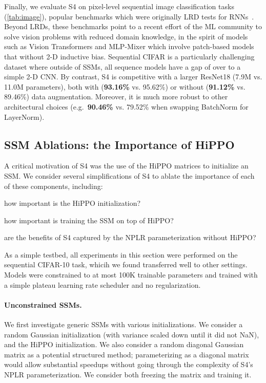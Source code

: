 \documentclass{article}
\newcommand{\methodabbrv}{S4}
\begin{document}
Finally,
we evaluate \methodabbrv{} on pixel-level sequential image classification tasks (\cref{tab:image}),
popular benchmarks which were originally LRD tests for RNNs~\citep{arjovsky2016unitary}.
Beyond LRDs, these benchmarks point to a recent effort of the ML community to solve vision
problems with reduced domain knowledge,
in the spirit of models such as Vision Transformers \citep{dosovitskiy2020image} and MLP-Mixer \citep{tolstikhin2021mlp} which involve patch-based models that without 2-D inductive bias.
Sequential CIFAR is a particularly challenging dataset where outside of SSMs, all sequence models have a gap of over  to a simple 2-D CNN.
By contrast, \methodabbrv{} is competitive with a larger ResNet18 (7.9M vs. 11.0M parameters), both with (\textbf{93.16\%} vs. 95.62\%) or without (\textbf{91.12\%} vs. 89.46\%) data augmentation.
Moreover, it is much more robust to other architectural choices (e.g.\ \textbf{90.46\%} vs. 79.52\% when swapping BatchNorm for LayerNorm).

\subsection{SSM Ablations: the Importance of HiPPO}
A critical motivation of S4 was the use of the HiPPO matrices to initialize an SSM.
We consider several simplifications of S4 to ablate the importance of each of these components, including:
\begin{enumerate*}[label=(\roman*)]\item how important is the HiPPO initialization?
  \item how important is training the SSM on top of HiPPO?
  \item are the benefits of S4 captured by the NPLR parameterization without HiPPO?
\end{enumerate*}

As a simple testbed, all experiments in this section were performed on the sequential CIFAR-10 task,
whicih we found transferred well to other settings.
Models were constrained to at most 100K trainable parameters and trained with a simple plateau learning rate scheduler and no regularization.

\paragraph{Unconstrained SSMs.}
We first investigate generic SSMs with various initializations.
We consider a random Gaussian initialization (with variance scaled down until it did not NaN),  and the HiPPO initialization.
We also consider a random diagonal Gaussian matrix as a potential structured method; parameterizing  as a diagonal matrix would allow substantial speedups without going through the complexity of S4's NPLR parameterization.
We consider both freezing the  matrix and training it.
\end{document}
